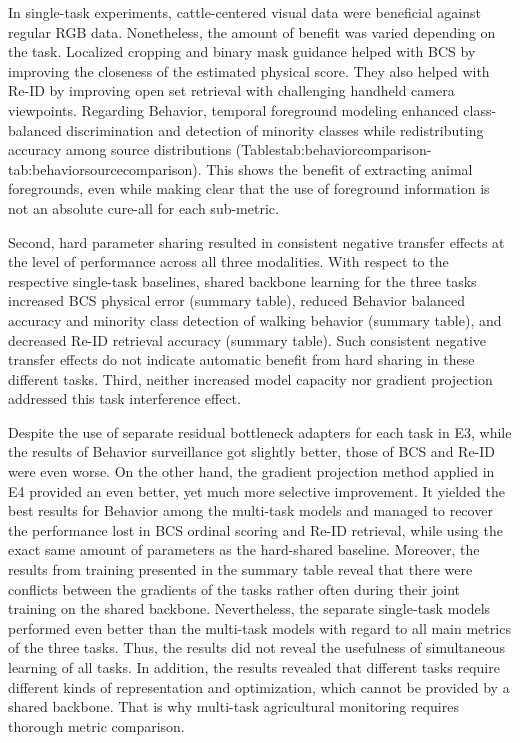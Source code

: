 In single-task experiments, cattle-centered visual data were beneficial against regular RGB data. Nonetheless, the amount of benefit was varied depending on the task. Localized cropping and binary mask guidance helped with BCS by improving the closeness of the estimated physical score. They also helped with Re-ID by improving open set retrieval with challenging handheld camera viewpoints. Regarding Behavior, temporal foreground modeling enhanced class-balanced discrimination and detection of minority classes while redistributing accuracy among source distributions (Tablestab:behaviorcomparison-tab:behaviorsourcecomparison). This shows the benefit of extracting animal foregrounds, even while making clear that the use of foreground information is not an absolute cure-all for each sub-metric.

Second, hard parameter sharing resulted in consistent negative transfer effects at the level of performance across all three modalities. With respect to the respective single-task baselines, shared backbone learning for the three tasks increased BCS physical error (summary table), reduced Behavior balanced accuracy and minority class detection of walking behavior (summary table), and decreased Re-ID retrieval accuracy (summary table). Such consistent negative transfer effects do not indicate automatic benefit from hard sharing in these different tasks. Third, neither increased model capacity nor gradient projection addressed this task interference effect.

Despite the use of separate residual bottleneck adapters for each task in E3, while the results of Behavior surveillance got slightly better, those of BCS and Re-ID were even worse. On the other hand, the gradient projection method applied in E4 provided an even better, yet much more selective improvement. It yielded the best results for Behavior among the multi-task models and managed to recover the performance lost in BCS ordinal scoring and Re-ID retrieval, while using the exact same amount of parameters as the hard-shared baseline. Moreover, the results from training presented in the summary table reveal that there were conflicts between the gradients of the tasks rather often during their joint training on the shared backbone. Nevertheless, the separate single-task models performed even better than the multi-task models with regard to all main metrics of the three tasks. Thus, the results did not reveal the usefulness of simultaneous learning of all tasks. In addition, the results revealed that different tasks require different kinds of representation and optimization, which cannot be provided by a shared backbone. That is why multi-task agricultural monitoring requires thorough metric comparison.
